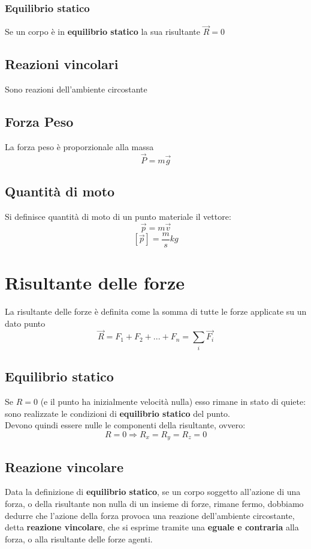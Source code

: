 \documentclass[a4paper]{report}
\begin{document}
  \subsubsection{Equilibrio statico}
  Se un corpo è in \textbf{equilibrio statico} la sua risultante $\vec{R} = 0$

  \subsection{Reazioni vincolari}
  Sono reazioni dell'ambiente circostante

  \subsection{Forza Peso}
  La forza peso è proporzionale alla massa
  \[ \vec{P} = m\vec{g} \]

  \subsection{Quantità di moto}
  Si definisce quantità di moto di un punto materiale il vettore:
  \[ \vec{p} = m \vec{v} \]
  \[ [\vec{p}] = \frac{m}{s} kg \]

  \section{Risultante delle forze}
  La risultante delle forze è definita come la somma di tutte le forze applicate su un dato punto
  \[ \vec{R} = F_1 + F_2 + ... + F_n = \sum_{i} \vec{F_i} \]

  \subsection{Equilibrio statico}
  Se $R = 0$ (e il punto ha inizialmente velocità nulla) esso rimane in stato di quiete: sono realizzate le condizioni di \textbf{equilibrio statico} del punto.\\
  Devono quindi essere nulle le componenti della risultante, ovvero:
  \[ R = 0 \Rightarrow R_x = R_y = R_z = 0 \]

  \subsection{Reazione vincolare}
  Data la definizione di \textbf{equilibrio statico}, se un corpo soggetto all'azione di una forza, o della risultante non nulla di un insieme di forze, rimane fermo, dobbiamo dedurre che l'azione della forza provoca una reazione dell'ambiente circostante, detta \textbf{reazione vincolare}, che si esprime tramite una \textbf{eguale e contraria} alla forza, o alla risultante delle forze agenti.
\end{document}
